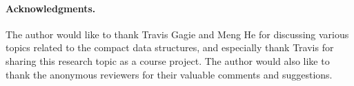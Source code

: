 \documentclass[smallabstract,smallcaptions]{dccpaper}
\def\idtt#1{\ensuremath{\mathtt{#1}}}
\def\partner{\idtt{partner}}
\def\path{\idtt{Path}}
\def\loci{\idtt{loci}}
\def\lMost{\idtt{lMost}}
\def\rMost{\idtt{rMost}}
\def\depth{\idtt{depth}}
\begin{document}

\paragraph{Acknowledgments.}The author would like to thank Travis Gagie and Meng He for discussing various topics related to the compact data structures, and especially thank Travis for sharing this research topic as a course project. 
The author would also like to thank the anonymous reviewers for their valuable comments and suggestions.




\end{document}
